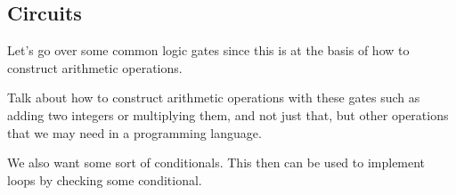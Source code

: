 \documentclass{article}
\begin{document}
  \subsection{Circuits} 

    Let's go over some common logic gates since this is at the basis of how to construct arithmetic operations. 
    
    \begin{definition}
      
    \end{definition}

    \begin{definition}
      
    \end{definition}

    \begin{definition}[NAND]
      
    \end{definition}

    Talk about how to construct arithmetic operations with these gates such as adding two integers or multiplying them, and not just that, but other operations that we may need in a programming language. 

    \begin{theorem}
      
    \end{theorem}

    \begin{theorem}
      
    \end{theorem}

    \begin{theorem}
      
    \end{theorem}

    \begin{theorem}
      
    \end{theorem}

    \begin{theorem}
      
    \end{theorem}

    We also want some sort of conditionals. This then can be used to implement loops by checking some conditional. 
\end{document}
